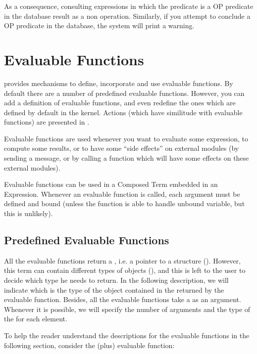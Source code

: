 As a consequence, consulting expressions in which the predicate is a OP predicate in
the database result as a non operation.  Similarly, if you attempt to conclude
a OP predicate in the database, the system will print a warning.

\chapter{Evaluable Functions}

\COPRS{} provides mechanisms to define, incorporate and use evaluable
functions. By default there are a number of predefined evaluable functions.
However, you can add a definition of evaluable functions, and even
redefine the ones which are defined by default in the kernel. Actions (which
have similitude with evaluable functions) are presented in .

Evaluable functions are used whenever you want to evaluate some expression, to
compute some results, or to have some ``side effects'' on external modules (by
sending a message, or by calling a function which will have some effects on
these external modules).

Evaluable functions can be used in a Composed Term embedded in an Expression.
Whenever an evaluable function is called, each argument must be defined and
bound (unless the function is able to handle unbound variable, but this is
unlikely).



\section{Predefined Evaluable Functions}

All the evaluable functions return a , i.e. a pointer to a
 structure (). However, this
term can contain different types of objects (), and this is left
to the user to decide which type he needs to return. In the following
description, we will indicate which is the type of the object contained in the
 returned by the evaluable function. Besides, all the evaluable
functions take a  as an argument. Whenever it is possible, we
will specify the number of arguments and the type of the  for each
element.

To help the reader understand the descriptions for the evaluable functions
in the following section, consider the \code{+} (plus) evaluable function:

